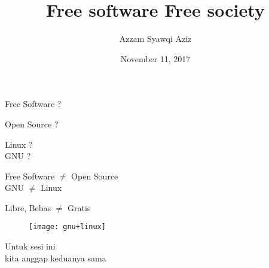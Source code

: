 \documentclass[notes]{beamer}       %
\title{Free software Free society}
\author{Azzam Syawqi Aziz}
\date{November 11, 2017}
\begin{document}
\maketitle

\begin{frame}
  \begin{center}
    \Huge Free Software ?
  \end{center}
\end{frame}

\begin{frame}
  \begin{center}
    \Huge Open Source ?
  \end{center}
\end{frame}

\begin{frame}
  \begin{center}
    \Huge Linux ? \\
    \Huge GNU ?
  \end{center}
\end{frame}

\begin{frame}
  \begin{center}
    \Huge Free Software {$\neq$}  Open Source \\
    \Huge GNU {$\neq$} Linux
  \end{center}
\end{frame}

\begin{frame}
  \begin{center}
    \Huge Libre, Bebas {$\neq$}  Gratis
  \end{center}
\end{frame}


\begin{frame}
  \begin{figure}
    \centering
    \texttt{[image: gnu+linux]}
  \end{figure}
\end{frame}

\begin{frame}
  \begin{center}
    \Huge Untuk sesi ini \\
    \small kita anggap keduanya sama
  \end{center}
\end{frame}
\end{document}
